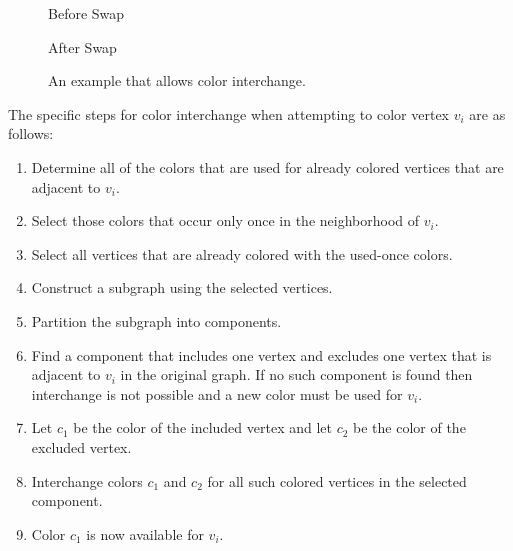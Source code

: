 \begin{figure}[H]
  \begin{minipage}{2.5in}
    \centering

    Before Swap
  \end{minipage}
  \begin{minipage}{2.5in}
    \centering

    After Swap
  \end{minipage}
  \caption{An example that allows color interchange.}
  \label{fig:interchange}
\end{figure}

The specific steps for color interchange when attempting to color vertex \(v_i\) are as follows:
\begin{enumerate}
\item Determine all of the colors that are used for already colored vertices that are adjacent to \(v_i\).
\item Select those colors that occur only once in the neighborhood of \(v_i\).
\item Select all vertices that are already colored with the used-once colors.
\item Construct a subgraph using the selected vertices.
\item\label{step:color:part} Partition the subgraph into components.
\item Find a component that includes one vertex and excludes one vertex that is adjacent to \(v_i\) in the original
  graph.  If no such component is found then interchange is not possible and a new color must be used for \(v_i\).
\item Let \(c_1\) be the color of the included vertex and let \(c_2\) be the color of the excluded vertex.
\item Interchange colors \(c_1\) and \(c_2\) for all such colored vertices in the selected component.
\item Color \(c_1\) is now available for \(v_i\).
\end{enumerate}

